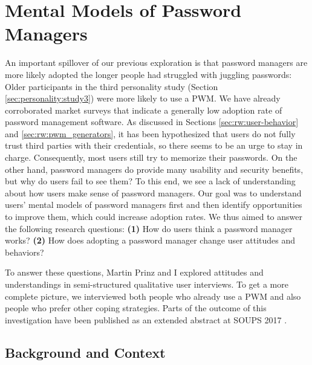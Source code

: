 \chapter[Mental Models of Password Managers]{Mental Models of Password Managers}\label{chap:mental_models_pwm}
An important spillover of our previous exploration is that password managers are more likely adopted the longer people had struggled with juggling passwords: Older participants in the third personality study (Section \ref{sec:personality:study3}) were more likely to use a \gls{PWM}. We have already corroborated market surveys that indicate a generally low adoption rate of password management software. As discussed in Sections \ref{sec:rw:user-behavior} and \ref{sec:rw:pwm_generators}, it has been hypothesized that users do not fully trust third parties with their credentials, so there seems to be an urge to stay in charge. Consequently, most users still try to memorize their passwords. On the other hand, password managers do provide many usability and security benefits, but why do users fail to see them? To this end, we see a lack of understanding about how users make sense of password managers. Our goal was to understand users' mental models of password managers first and then identify opportunities to improve them, which could increase adoption rates. 
We thus aimed to answer the following research questions: 
\textbf{(1)} How do users think a password manager works? 
\textbf{(2)} How does adopting a password manager change user attitudes and behaviors?


To answer these questions, Martin Prinz and I explored attitudes and understandings in semi-structured qualitative user interviews. To get a more complete picture, we interviewed both people who already use a \gls{PWM} and also people who prefer other coping strategies. Parts of the outcome of this investigation have been published as an extended abstract at SOUPS 2017 \cite{Prinz2017MentalModel}.

\section{Background and Context}

